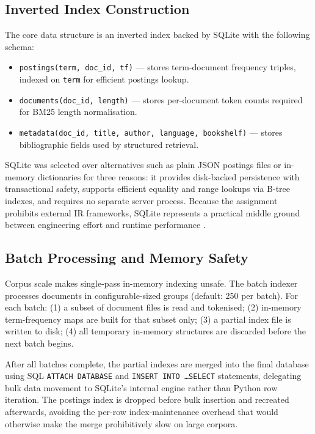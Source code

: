 \documentclass[sigconf]{acmart}
\begin{document}
\subsection{Inverted Index Construction}

The core data structure is an inverted index backed by SQLite with the following schema:

\begin{itemize}
    \item \texttt{postings(term, doc\_id, tf)} --- stores term-document frequency triples, indexed on \texttt{term} for efficient postings lookup.
    \item \texttt{documents(doc\_id, length)} --- stores per-document token counts required for BM25 length normalisation.
    \item \texttt{metadata(doc\_id, title, author, language, bookshelf)} --- stores bibliographic fields used by structured retrieval.
\end{itemize}

SQLite was selected over alternatives such as plain JSON postings files or in-memory dictionaries for three reasons: it provides disk-backed persistence with transactional safety, supports efficient equality and range lookups via B-tree indexes, and requires no separate server process. Because the assignment prohibits external IR frameworks, SQLite represents a practical middle ground between engineering effort and runtime performance \cite{zobel2006}.

\subsection{Batch Processing and Memory Safety}

Corpus scale makes single-pass in-memory indexing unsafe. The batch indexer processes documents in configurable-sized groups (default: 250 per batch). For each batch: (1) a subset of document files is read and tokenised; (2) in-memory term-frequency maps are built for that subset only; (3) a partial index file is written to disk; (4) all temporary in-memory structures are discarded before the next batch begins.

After all batches complete, the partial indexes are merged into the final database using SQL \texttt{ATTACH DATABASE} and \texttt{INSERT INTO \ldots SELECT} statements, delegating bulk data movement to SQLite's internal engine rather than Python row iteration. The postings index is dropped before bulk insertion and recreated afterwards, avoiding the per-row index-maintenance overhead that would otherwise make the merge prohibitively slow on large corpora.
\end{document}
